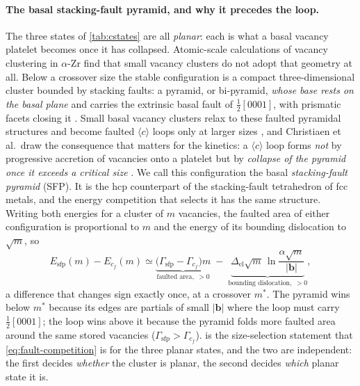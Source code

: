 \documentclass{article}
\newcommand{\cloop}{\ensuremath{\langle c\rangle}}
\newcommand{\bvec}{\bm b}
\begin{document}
\paragraph{The basal stacking-fault pyramid, and why it precedes the loop.}
The three states of \cref{tab:cstates} are all \emph{planar}: each is what a
basal vacancy platelet becomes once it has collapsed. Atomic-scale calculations
of vacancy clustering in $\alpha$-Zr find that small vacancy clusters do not
adopt that geometry at all. Below a crossover size the stable configuration is a compact
three-dimensional cluster bounded by stacking faults: a pyramid, or bi-pyramid,
\emph{whose base rests on the basal plane} and carries the extrinsic basal fault
of $\tfrac12[0001]$, with prismatic facets closing it
\citep{christiaen2019new,dediego2008structure}. Small basal vacancy clusters
relax to these faulted pyramidal structures and become faulted \cloop{} loops
only at larger sizes \citep{dediego2008structure,varvenne2014vacancy}, and
Christiaen et al.\ draw the consequence that matters for the kinetics: a \cloop{}
loop forms \emph{not} by progressive accretion of vacancies onto a platelet but
by \emph{collapse of the pyramid once it exceeds a critical size}
\citep{christiaen2019new}. We call this configuration the basal
\emph{stacking-fault pyramid} (SFP). It is the hcp counterpart of the
stacking-fault tetrahedron of fcc metals, and the energy competition that selects
it has the same structure. Writing both energies
for a cluster of $m$ vacancies, the faulted area of either configuration is
proportional to $m$ and the energy of its bounding dislocation to $\sqrt m$, so
\begin{equation}
  E_{\mathrm{sfp}}(m)-E_{c_f}(m)
  \simeq
  \underbrace{\bigl(\Gamma_{\mathrm{sfp}}-\Gamma_{c_f}\bigr)m}_{\text{faulted area},\;>0}
  \;-\;
  \underbrace{\Delta_{\mathrm{el}}\sqrt{m}\,
     \ln\!\frac{\alpha\sqrt m}{|\bvec|}}_{\text{bounding dislocation},\;>0},
  \label{eq:sfp-competition}
\end{equation}
a difference that changes sign exactly once, at a crossover $m^{\ast}$. The
pyramid wins below $m^{\ast}$ because its edges are partials of small $|\bvec|$
where the loop must carry $\tfrac12[0001]$; the loop wins above it because the
pyramid folds more faulted area around the same stored vacancies
($\Gamma_{\mathrm{sfp}}>\Gamma_{c_f}$).  is the
size-selection statement that \cref{eq:fault-competition} is for the three planar
states, and the two are independent: the first decides \emph{whether} the cluster
is planar, the second decides \emph{which} planar state it is.
\end{document}
